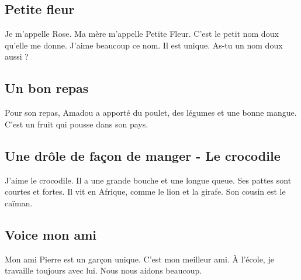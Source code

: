 \documentclass[11pt, french]{article}
\begin{document}
\subsection{Petite fleur}

Je m'appelle Rose. Ma mère m'appelle Petite Fleur. C'est le petit nom doux qu'elle me donne. J'aime beaucoup ce nom. Il est unique. As-tu un nom doux aussi ?

\subsection{Un bon repas}

Pour son repas, Amadou a apporté du poulet, des légumes et une bonne mangue. C'est un fruit qui pousse dans son pays.

\subsection{Une drôle de façon de manger - Le crocodile}

J'aime le crocodile. Il a une grande bouche et une longue queue. Ses pattes sont courtes et fortes. Il vit en Afrique, comme le lion et la girafe. Son cousin est le caïman.

\subsection{Voice mon ami}

Mon ami Pierre est un garçon unique. C'est mon meilleur ami. À l'école, je travaille toujours avec lui. Nous nous aidons beaucoup.

\vfill
\end{document}
